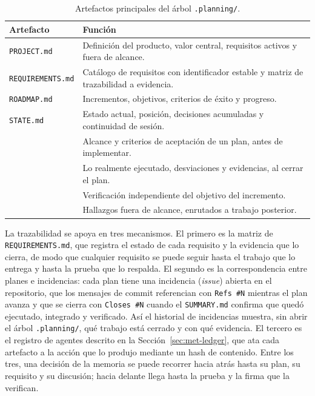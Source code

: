 \begin{table}[H]
\centering
\begin{tabularx}{\textwidth}{ | L{0.44\textwidth} | Y | }
    \hline
    \textbf{Artefacto} & \textbf{Función} \\
    \hline
    \texttt{PROJECT.md} & Definición del producto, valor central, requisitos activos y fuera de alcance. \\
    \hline
    \texttt{REQUIREMENTS.md} & Catálogo de requisitos con identificador estable y matriz de trazabilidad a evidencia. \\
    \hline
    \texttt{ROADMAP.md} & Incrementos, objetivos, criterios de éxito y progreso. \\
    \hline
    \texttt{STATE.md} & Estado actual, posición, decisiones acumuladas y continuidad de sesión. \\
    \hline
     & Alcance y criterios de aceptación de un plan, antes de implementar. \\
    \hline
     & Lo realmente ejecutado, desviaciones y evidencias, al cerrar el plan. \\
    \hline
     & Verificación independiente del objetivo del incremento. \\
    \hline
     & Hallazgos fuera de alcance, enrutados a trabajo posterior. \\
    \hline
\end{tabularx}
\caption{Artefactos principales del árbol \texttt{.planning/}.}
\label{tab:planning-arbol}
\end{table}

La trazabilidad se apoya en tres mecanismos. El primero es la matriz de
\texttt{REQUIREMENTS.md}, que registra el estado de cada requisito y la evidencia que lo
cierra, de modo que cualquier requisito se puede seguir hasta el trabajo que lo entrega y
hasta la prueba que lo respalda. El segundo es la correspondencia entre planes e incidencias:
cada plan tiene una incidencia (\textit{issue}) abierta en el repositorio, que los mensajes de
commit referencian con \texttt{Refs \#N} mientras el plan avanza y que se cierra con
\texttt{Closes \#N} cuando el \texttt{SUMMARY.md} confirma que quedó ejecutado, integrado y
verificado. Así el historial de incidencias muestra, sin abrir el árbol \texttt{.planning/}, qué
trabajo está cerrado y con qué evidencia. El tercero es el registro
de agentes descrito en la Sección~\ref{sec:met-ledger}, que ata cada artefacto a la acción
que lo produjo mediante un hash de contenido. Entre los tres, una decisión de la memoria se
puede recorrer hacia atrás hasta su plan, su requisito y su discusión; hacia delante llega
hasta la prueba y la firma que la verifican.

